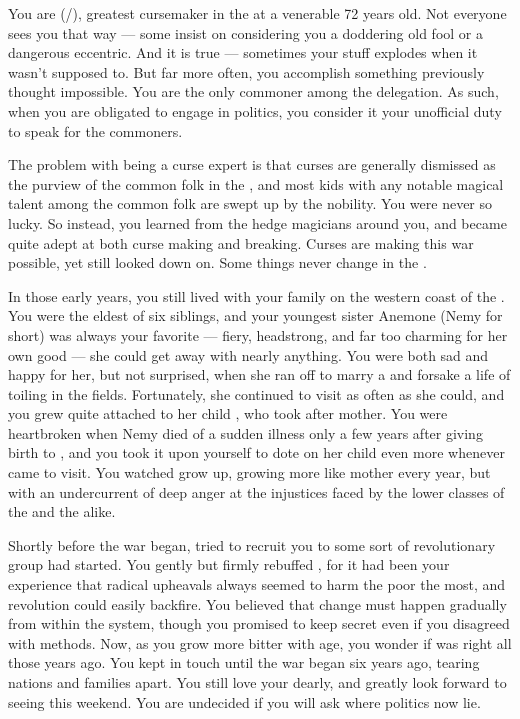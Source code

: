 \documentclass[char]{GL2020}
\begin{document}
\name{\cCurse{}}

You are \cCurse{\full} (\cCurse{\they}/\cCurse{\them}), greatest cursemaker in the \pFarm{} at a venerable 72 years old. Not everyone sees you that way — some insist on considering you a doddering old fool or a dangerous eccentric. And it is true — sometimes your stuff explodes when it wasn't supposed to. But far more often, you accomplish something previously thought impossible. You are the only commoner among the \pFarm{} delegation. As such, when you are obligated to engage in politics, you consider it your unofficial duty to speak for the commoners.

The problem with being a curse expert is that curses are generally dismissed as the purview of the common folk in the \pFarm{}, and most kids with any notable magical talent among the common folk are swept up by the nobility. You were never so lucky. So instead, you learned from the hedge magicians around you, and became quite adept at both curse making and breaking. Curses are making this war possible, yet still looked down on. Some things never change in the \pFarm{}.

In those early years, you still lived with your family on the western coast of the \pFarm{}. You were the eldest of six siblings, and your youngest sister Anemone (Nemy for short) was always your favorite — fiery, headstrong, and far too charming for her own good — she could get away with nearly anything. You were both sad and happy for her, but not surprised, when she ran off to marry a \pShippie{} and forsake a life of toiling in the fields. Fortunately, she continued to visit as often as she could, and you grew quite attached to her child \cChupLeader{}, who took after \cChupLeader{\their} mother. You were heartbroken when Nemy died of a sudden illness only a few years after giving birth to \cChupLeader{}, and you took it upon yourself to dote on her child even more whenever \cChupLeader{\they} came to visit. You watched \cChupLeader{\them} grow up, growing more like \cChupLeader{\their} mother every year, but with an undercurrent of deep anger at the injustices faced by the lower classes of the \pFarm{} and the \pShip{} alike. 

Shortly before the war began, \cChupLeader{\they} tried to recruit you to some sort of revolutionary group \cChupLeader{\they} had started. You gently but firmly rebuffed \cChupLeader{\them}, for it had been your experience that radical upheavals always seemed to harm the poor the most, and revolution could easily backfire. You believed that change must happen gradually from within the system, though you promised to keep \cChupLeader{\their} secret even if you disagreed with \cChupLeader{\their} methods. Now, as you grow more bitter with age, you wonder if \cChupLeader{} was right all those years ago. You kept in touch until the war began six years ago, tearing nations and families apart. You still love your \cChupLeader{\nibling} dearly, and greatly look forward to seeing \cChupLeader{\them} this weekend. You are undecided if you will ask where \cChupLeader{\their} politics now lie.
\end{document}
